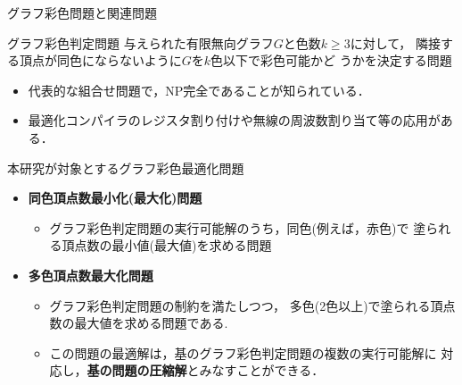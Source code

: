 \documentclass[dvipdfmx,11pt]{beamer}
\begin{document}
\begin{frame}{グラフ彩色問題と関連問題}
  \begin{block}{グラフ彩色判定問題}\centering
    与えられた有限無向グラフ$G$と色数$k\geq 3$に対して，
    隣接する頂点が同色にならないように$G$を$k$色以下で彩色可能かど
    うかを決定する問題
    \begin{itemize}
    \item 代表的な組合せ問題で，NP完全であることが知られている．
    \item 最適化コンパイラのレジスタ割り付けや無線の周波数割り当て等の応用がある．
    \end{itemize}
  \end{block}
  \pause
  \begin{alertblock}{本研究が対象とするグラフ彩色最適化問題}
    \begin{itemize}
    \item \textbf{同色頂点数最小化(最大化)問題}
      \begin{itemize}
      \item グラフ彩色判定問題の実行可能解のうち，同色(例えば，赤色)で
        塗られる頂点数の最小値(最大値)を求める問題
      \end{itemize}
    \item \textbf{多色頂点数最大化問題}
      \begin{itemize}
      \item グラフ彩色判定問題の制約を満たしつつ，
        多色(2色以上)で塗られる頂点数の最大値を求める問題である.
      \item この問題の最適解は，基のグラフ彩色判定問題の複数の実行可能解に
        対応し，\alert{\bf 基の問題の圧縮解}とみなすことができる．
      \end{itemize}
    \end{itemize}
  \end{alertblock}
\end{frame}
\end{document}
